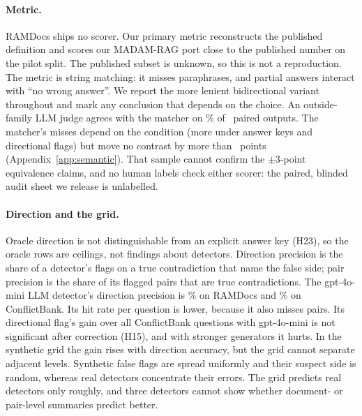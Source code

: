 \paragraph{Metric.} RAMDocs ships no scorer. Our primary metric reconstructs the published definition and scores our
MADAM-RAG port close to the published number on the pilot split. The published subset is unknown, so this is
not a reproduction. The metric is string matching: it misses paraphrases, and partial answers interact with ``no wrong
answer''. We report the more lenient bidirectional variant throughout and mark any conclusion that depends on the
choice. An outside-family LLM judge agrees with the matcher on \semAgree\% of \semN\ paired outputs. The matcher's
misses depend on the condition (more under answer keys and directional flags) but move no contrast by more than
\semDidMax\ points (Appendix~\ref{app:semantic}). That sample cannot confirm the $\pm$3-point equivalence claims, and
no human labels check either scorer: the paired, blinded audit sheet we release is unlabelled.

\paragraph{Direction and the grid.} Oracle direction is not distinguishable from an explicit answer key (H23), so the
oracle rows are ceilings, not findings about detectors. Direction precision is the share of a detector's flags on a true
contradiction that name the false side; pair precision is the share of its flagged pairs that are
true contradictions. The gpt-4o-mini LLM detector's direction precision is
\dirAccLlm\% on RAMDocs and \cbDirAccLlm\% on ConflictBank. Its hit rate per question is lower, because it also misses pairs. Its directional flag's gain over
all ConflictBank questions with gpt-4o-mini is not significant after correction (H15), and with stronger generators it
hurts. In the synthetic grid the gain rises with direction accuracy, but the grid cannot separate adjacent levels.
Synthetic false flags are spread uniformly and their suspect side is random, whereas real detectors concentrate their
errors. The grid predicts real detectors only roughly, and three detectors cannot show whether document- or pair-level
summaries predict better.

